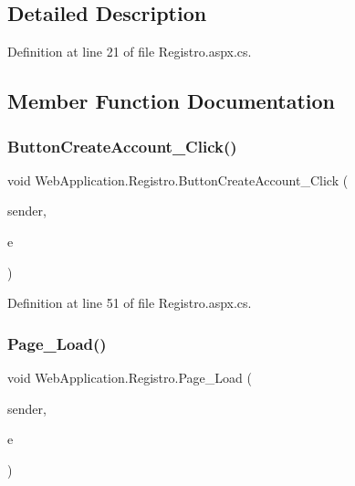 \subsection{Detailed Description}


Definition at line 21 of file Registro.\+aspx.\+cs.



\subsection{Member Function Documentation}
\mbox{\label{classWebApplication_1_1Registro_a7189efc9ef450f0288049e1089719b86}} 
\subsubsection{\texorpdfstring{ButtonCreateAccount\_Click()}{ButtonCreateAccount\_Click()}}
{\footnotesize\ttfamily void Web\+Application.\+Registro.\+Button\+Create\+Account\+\_\+\+Click (\begin{DoxyParamCaption}\item[{object}]{sender,  }\item[{Event\+Args}]{e }\end{DoxyParamCaption})\hspace{0.3cm}{\ttfamily [protected]}}



Definition at line 51 of file Registro.\+aspx.\+cs.

\mbox{\label{classWebApplication_1_1Registro_a78c6a12b73bcc3a6b4c4a2fee7cf0698}} 
\subsubsection{\texorpdfstring{Page\_Load()}{Page\_Load()}}
{\footnotesize\ttfamily void Web\+Application.\+Registro.\+Page\+\_\+\+Load (\begin{DoxyParamCaption}\item[{object}]{sender,  }\item[{Event\+Args}]{e }\end{DoxyParamCaption})\hspace{0.3cm}{\ttfamily [protected]}}



